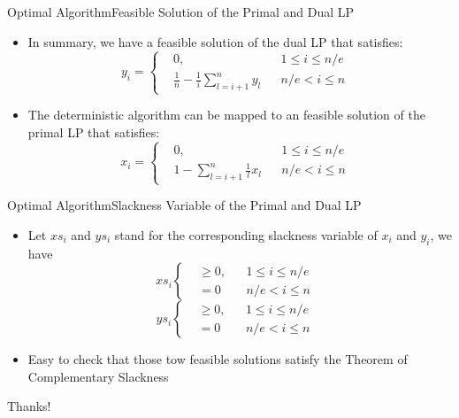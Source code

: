 \documentclass{beamer}
\begin{document}
\begin{frame}{Optimal Algorithm}{Feasible Solution of the Primal and Dual LP}
	\begin{itemize}
		\item In summary, we have a feasible solution of the dual LP that satisfies:
				\begin{equation}
					y_i = \left\{\begin{aligned}
							&0,& &1\leq i\leq n/e&\\
							&\frac{1}{n}-\frac{1}{i}\sum_{l = i+1}^n y_l& &n/e < i\leq n&
					\end{aligned}
					\right.
				\end{equation}
		\item The deterministic algorithm can be mapped to an feasible solution of the primal LP that satisfies:
				\begin{equation}
					x_i = \left\{\begin{aligned}
							&0,& &1\leq i\leq n/e&\\
							&1-\sum_{l = i+1}^n \frac{1}{l}x_l& &n/e < i\leq n&
					\end{aligned}
					\right.
				\end{equation}
	\end{itemize}
\end{frame}

\begin{frame}{Optimal Algorithm}{Slackness Variable of the Primal and Dual LP}
	\begin{itemize}
		\item Let $xs_i$ and $ys_i$ stand for the corresponding slackness variable of $x_i$ and $y_i$, we have 
				\begin{equation}
					xs_i  \left\{\begin{aligned}
							&\geq 0,& &1\leq i\leq n/e&\\
							&= 0& &n/e < i\leq n&
					\end{aligned}
					\right.
				\end{equation}
				\begin{equation}
					ys_i  \left\{\begin{aligned}
							&\geq 0,& &1\leq i\leq n/e&\\
							&= 0& &n/e < i\leq n&
					\end{aligned}
					\right.
				\end{equation}

			\item Easy to check that those tow feasible solutions satisfy the Theorem of Complementary Slackness 
	\end{itemize}
\end{frame}
\begin{frame}
		\centering Thanks!
\end{frame}
\end{document}
